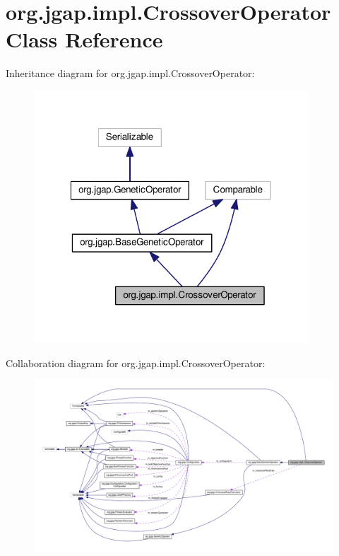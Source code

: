 \hypertarget{classorg_1_1jgap_1_1impl_1_1_crossover_operator}{\section{org.\-jgap.\-impl.\-Crossover\-Operator Class Reference}
\label{classorg_1_1jgap_1_1impl_1_1_crossover_operator}
}


Inheritance diagram for org.\-jgap.\-impl.\-Crossover\-Operator\-:
\nopagebreak
\begin{figure}[H]
\begin{center}
\leavevmode
\includegraphics[width=291pt]{classorg_1_1jgap_1_1impl_1_1_crossover_operator__inherit__graph}
\end{center}
\end{figure}


Collaboration diagram for org.\-jgap.\-impl.\-Crossover\-Operator\-:
\nopagebreak
\begin{figure}[H]
\begin{center}
\leavevmode
\includegraphics[width=350pt]{classorg_1_1jgap_1_1impl_1_1_crossover_operator__coll__graph}
\end{center}
\end{figure}
